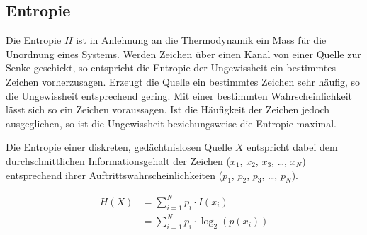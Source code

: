 \subsection{Entropie}

Die Entropie $H$ ist in Anlehnung an die Thermodynamik ein Mass für die
Unordnung eines Systems. Werden Zeichen über einen Kanal von einer Quelle zur
Senke geschickt, so entspricht die Entropie der Ungewissheit ein bestimmtes
Zeichen vorherzusagen. Erzeugt die Quelle ein bestimmtes Zeichen sehr häufig, so
die Ungewissheit entsprechend gering. Mit einer bestimmten Wahrscheinlichkeit
lässt sich so ein Zeichen voraussagen. Ist die Häufigkeit der Zeichen jedoch
ausgeglichen, so ist die Ungewissheit beziehungsweise die Entropie maximal. 

Die Entropie einer diskreten, gedächtnislosen Quelle $X$ entspricht dabei dem
durchschnittlichen Informationsgehalt der Zeichen ($x_1$, $x_2$, $x_3$, \ldots,
$x_N$) entsprechend ihrer Auftrittswahrscheinlichkeiten ($p_1$, $p_2$, $p_3$,
\ldots, $p_N$). 

\begin{align*}
H(X)& =\sum\limits_{i=1}^N p_i \cdot I(x_i) \\
& =\sum\limits_{i=1}^N p_i \cdot \log_2\left(p(x_i)\right)
\end{align*}
